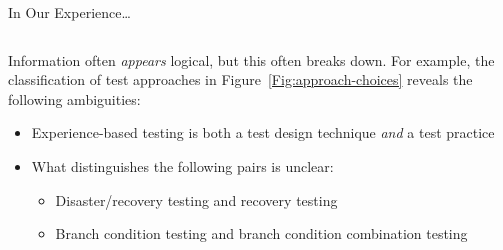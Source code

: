 \documentclass[22pt]{beamer}
\begin{document}
\begin{frame}[fragile]
\begin{textblock}{7.25}
\begin{block}{\fontsize{37}{20}\selectfont In Our Experience\dots}
\begin{columns}
\begin{column}{0.25\textwidth}
                    Information often \emph{appears} logical, but this often
                    breaks down. For example, the classification of test
                    approaches in Figure~\ref{Fig:approach-choices} reveals the
                    following ambiguities:
                    \begin{itemize}
                        \item Experience-based testing is both a test design
                              technique \emph{and} a test practice
                        \item What distinguishes the following pairs is unclear:
                              \begin{itemize}
                                  \item Disaster/recovery testing and recovery
                                        testing
                                  \item Branch condition testing and branch
                                        condition combination testing
                              \end{itemize}
                    \end{itemize}
                \end{column}
            \end{columns}
            \vspace{3mm}
        \end{block}
    \end{textblock}


\end{frame}
\end{document}
